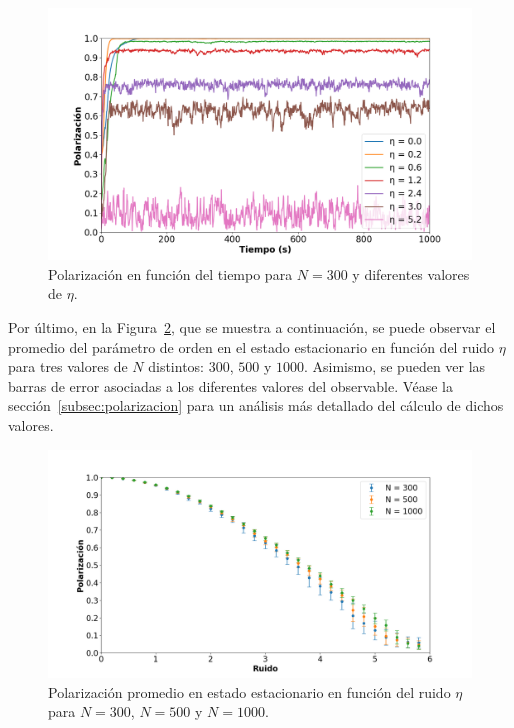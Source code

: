 \documentclass[11pt, a4paper]{article}
\begin{document}
            \begin{figure}[H]
                \centering
                \includegraphics[width=\textwidth]{./va_vs_time-n300}
                \caption{Polarización en función del tiempo para $N = 300$ y diferentes valores de $\eta$.}
                \label{fig:parametro_orden_2}
            \end{figure}

            Por último, en la Figura~\ref{fig:parametro_orden_3}, que se muestra a continuación, se puede observar el
            promedio del parámetro de orden en el estado estacionario en función del ruido $\eta$ para tres valores de
            $N$ distintos: $300$, $500$ y $1000$.
            Asimismo, se pueden ver las barras de error asociadas a los diferentes valores del observable.
            Véase la sección~\ref{subsec:polarizacion} para un análisis más detallado del cálculo de dichos valores.

            \begin{figure}[H]
                \centering
                \includegraphics[width=\textwidth]{./va_vs_eta}
                \caption{Polarización promedio en estado estacionario en función del ruido $\eta$ para $N=300$, $N=500$ y $N=1000$.}
                \label{fig:parametro_orden_3}
            \end{figure}
\end{document}
